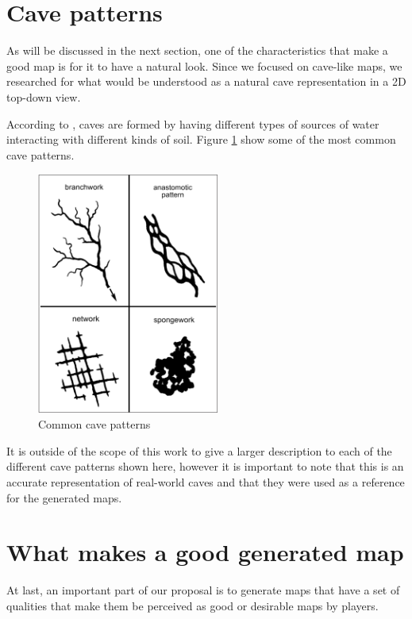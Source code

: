 \section{Cave patterns}

As will be discussed in the next section, one of the characteristics that make a good map is for it to have a natural look. Since we focused on cave-like maps, we researched for what would be understood as a natural cave representation in a 2D top-down view.

According to \textcite{audra:2011}, caves are formed by having different types of sources of water interacting with different kinds of soil. Figure \ref{fig:cave_patterns} show some of the most common cave patterns.

\begin{figure}[h]
    \caption{Common cave patterns}
    \centerline{\includegraphics[width=6cm]{images/proposal/cave_patterns.png}}
    \label{fig:cave_patterns}
\end{figure}

It is outside of the scope of this work to give a larger description to each of the different cave patterns shown here, however it is important to note that this is an accurate representation of real-world caves and that they were used as a reference for the generated maps.

\section{What makes a good generated map}
\label{sec:goodmap}

At last, an important part of our proposal is to generate maps that have a set of qualities that make them be perceived as good or desirable maps by players.

